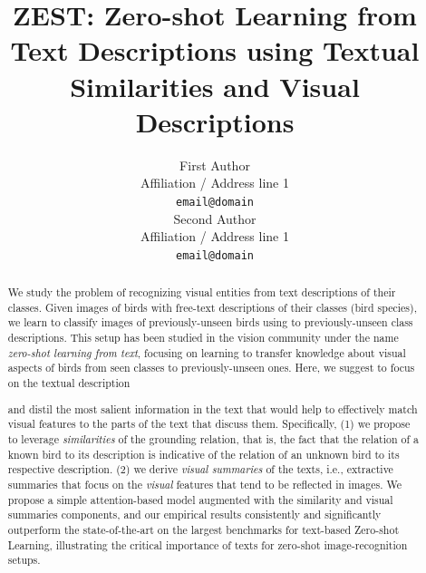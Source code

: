 \documentclass[11pt,a4paper]{article}
\title{ZEST: Zero-shot Learning from Text Descriptions using Textual Similarities and Visual Descriptions}
\author{First Author \\
  Affiliation / Address line 1 \\
  \texttt{email@domain} \\\And
  Second Author \\
  Affiliation / Address line 1 \\
  \texttt{email@domain} \\}
\date{}
\begin{document}
\maketitle
\begin{abstract}



We study the problem of recognizing visual entities from text descriptions of their classes. Given images of birds with free-text descriptions of their classes (bird species), we learn to classify images of previously-unseen birds using to previously-unseen class descriptions. This setup has been studied in the vision community under the name {\em zero-shot learning from text}, focusing on learning to transfer knowledge about visual aspects of birds from seen classes to previously-unseen ones. Here, we suggest to focus on the textual description 

and distil the most salient information in the text that would help to effectively match visual features to the parts of the text that  discuss them. 
Specifically,  %
(1) we propose to leverage {\em similarities} of the grounding relation, that is,  the fact that %
the relation of a known bird to its description is indicative of the relation of an unknown bird to its respective description. 
(2) we derive {\em visual summaries} of the texts, i.e.,  %
extractive summaries that focus on the {\em visual} features that tend to be reflected in images.
We propose a simple attention-based model augmented with   the  similarity and visual summaries components, and our empirical results  consistently and significantly outperform the state-of-the-art on the largest benchmarks for text-based Zero-shot Learning, illustrating the critical importance of texts for zero-shot image-recognition setups.




\end{abstract}
\end{document}
